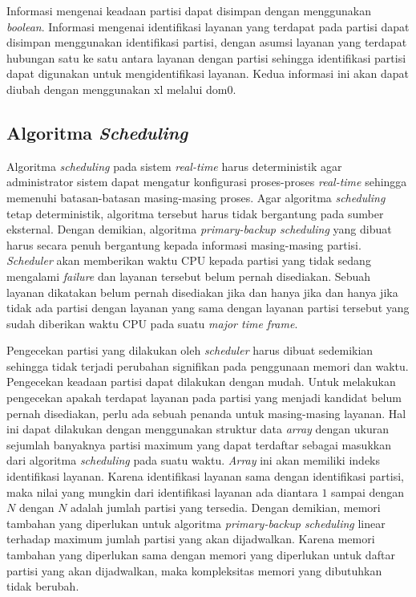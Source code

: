 Informasi mengenai keadaan partisi dapat disimpan dengan menggunakan \textit{boolean}. Informasi
mengenai identifikasi layanan yang terdapat pada partisi dapat disimpan menggunakan
identifikasi partisi, dengan asumsi layanan yang terdapat hubungan satu ke satu antara
layanan dengan partisi sehingga identifikasi partisi dapat digunakan untuk mengidentifikasi
layanan. Kedua informasi ini akan dapat diubah dengan menggunakan xl melalui dom0.

\subsection{Algoritma \textit{Scheduling}}
\label{section:algoritma_scheduling}

Algoritma \textit{scheduling} pada sistem \textit{real-time} harus deterministik agar
administrator sistem dapat mengatur konfigurasi proses-proses \textit{real-time} sehingga
memenuhi batasan-batasan masing-masing proses. Agar algoritma \textit{scheduling} tetap
deterministik, algoritma tersebut harus tidak bergantung pada sumber eksternal. Dengan demikian,
algoritma \textit{primary-backup scheduling} yang dibuat harus secara penuh bergantung kepada
informasi masing-masing partisi. \textit{Scheduler} akan memberikan waktu CPU kepada partisi
yang tidak sedang mengalami \textit{failure} dan layanan tersebut belum pernah
disediakan. Sebuah layanan dikatakan belum pernah disediakan jika dan hanya jika dan
hanya jika tidak ada partisi dengan layanan yang sama dengan layanan partisi
tersebut yang sudah diberikan waktu CPU pada suatu \textit{major time frame}.

Pengecekan partisi yang dilakukan oleh \textit{scheduler} harus dibuat sedemikian sehingga tidak
terjadi perubahan signifikan pada penggunaan memori dan waktu. Pengecekan keadaan partisi dapat
dilakukan dengan mudah. Untuk melakukan pengecekan apakah terdapat layanan pada partisi
yang menjadi kandidat belum pernah disediakan, perlu ada sebuah penanda untuk masing-masing
layanan. Hal ini dapat dilakukan dengan menggunakan struktur data \textit{array} dengan
ukuran sejumlah banyaknya partisi maximum yang dapat terdaftar sebagai masukkan dari algoritma
\textit{scheduling} pada suatu waktu. \textit{Array} ini akan memiliki indeks identifikasi
layanan. Karena identifikasi layanan sama dengan identifikasi partisi, maka
nilai yang mungkin dari identifikasi layanan ada diantara $1$ sampai dengan $N$ dengan
$N$ adalah jumlah partisi yang tersedia. Dengan demikian, memori tambahan yang diperlukan untuk
algoritma \textit{primary-backup scheduling} linear terhadap maximum jumlah partisi yang akan
dijadwalkan. Karena memori tambahan yang diperlukan sama dengan memori yang diperlukan untuk
daftar partisi yang akan dijadwalkan, maka kompleksitas memori yang dibutuhkan tidak berubah.

